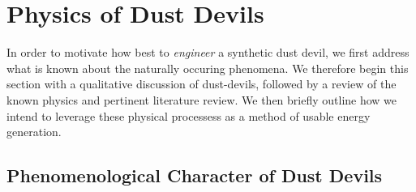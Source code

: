 \section{Physics of Dust Devils}
\label{sec:physics}


In order to motivate how best to \textit{engineer} a synthetic
dust devil, we first address what is known about the naturally occuring
phenomena. We therefore begin this section with a qualitative discussion
of dust-devils, followed by a review of the known physics and pertinent 
literature review. We then briefly outline how we intend to leverage
these physical processess as a method of usable energy generation. 


\subsection{Phenomenological Character of Dust Devils}


